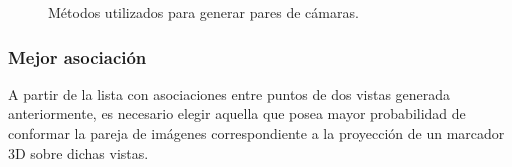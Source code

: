  \begin{figure}[!ht]
   \centering 
    \hspace{2cm}
   \caption{Métodos utilizados para generar pares de cámaras.}  
   \label{img_asociacion} 
 \end{figure} 





\subsubsection{Mejor asociación}

A partir de la lista con asociaciones entre puntos de dos vistas generada anteriormente, es necesario elegir aquella que posea mayor probabilidad de conformar la pareja de imágenes correspondiente a la proyección de un marcador 3D sobre dichas vistas.



